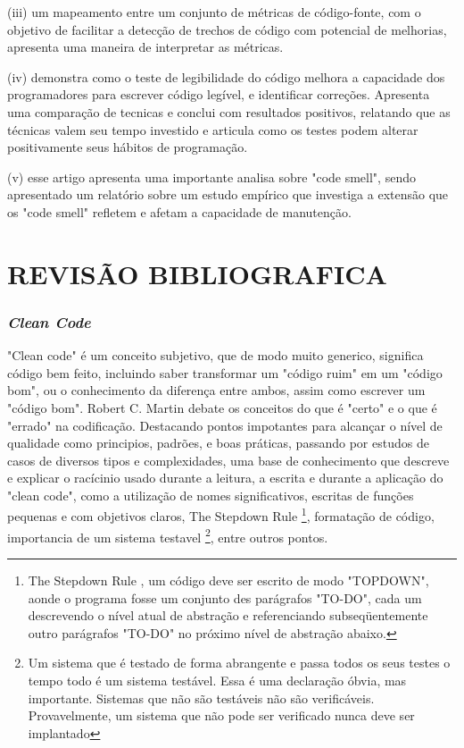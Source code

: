 \documentclass[12pt]{article}
\begin{document}
 (iii) \cite{TR_CLEAN_CODE_METRICA} um mapeamento entre um conjunto de métricas de código-fonte, com o objetivo de facilitar a detecção de trechos de código com potencial de melhorias, apresenta uma maneira de interpretar as métricas.

 (iv) \cite{CODE_READABILITY_TESTING_STUDY} demonstra
como o teste de legibilidade do código melhora a capacidade dos programadores
para escrever código legível, e identificar correções. Apresenta uma comparação de tecnicas e conclui com resultados positivos, relatando que as técnicas valem seu tempo investido e articula como os testes podem alterar positivamente seus hábitos de programação.
 
 (v) \cite{CODE_SMELLS_REFLECT_IMPORTANT_MAINTAINABILITY_ASPECTS} esse artigo apresenta uma importante analisa sobre "code smell", sendo apresentado um relatório sobre um estudo empírico que investiga a extensão que os "code smell" refletem e afetam a capacidade de manutenção.

\part{REVISÃO BIBLIOGRAFICA} \label{sec:revisaobibliografica}

\section{\textit{Clean Code}} \label{sec:cleancode}

"Clean code" \cite{ROBERT_MARTIN_CLEAN_CODE} é um conceito subjetivo, que de modo muito generico, significa código bem feito, incluindo saber transformar um "código ruim" em um "código bom", ou o conhecimento da diferença entre ambos, assim como escrever um "código bom". Robert C. Martin \cite{ROBERT_MARTIN_CLEAN_CODE} debate os conceitos do que é "certo" e o que é "errado" na codificação. Destacando pontos impotantes para alcançar o nível de qualidade como principios, padrões, e boas práticas, passando por estudos de casos de diversos tipos e complexidades, uma base de conhecimento que descreve e explicar o racícinio usado durante a leitura, a escrita e durante a aplicação do "clean code", como a utilização de nomes significativos, escritas de funções pequenas e com objetivos claros, The Stepdown Rule \footnote{The Stepdown Rule \cite{ROBERT_MARTIN_CLEAN_CODE}, um código deve ser escrito de modo "TOPDOWN", aonde o programa fosse um conjunto des parágrafos "TO-DO", cada um descrevendo o nível atual de abstração e referenciando subseqüentemente outro parágrafos "TO-DO" no próximo nível de abstração abaixo.}, formatação de código, importancia de um sistema testavel \footnote{Um sistema que é testado de forma abrangente e passa todos os seus testes o tempo todo é um sistema testável. Essa é uma declaração óbvia, mas importante. Sistemas que não são testáveis
não são verificáveis. Provavelmente, um sistema que não pode ser verificado nunca deve ser implantado}, entre outros pontos. 
\end{document}
